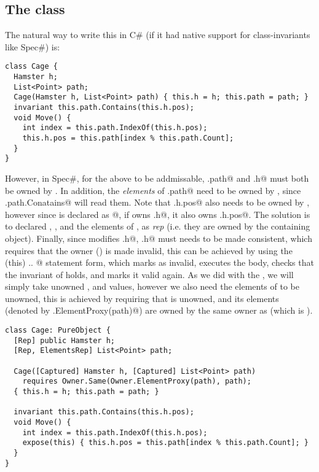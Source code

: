 \subsection{The \Q@Cage@ class} 
The natural way to write this in C\# (if it had native support for class-invariants like Spec\#) is:
\begin{lstlisting}
class Cage {
  Hamster h;
  List<Point> path;
  Cage(Hamster h, List<Point> path) { this.h = h; this.path = path; }
  invariant this.path.Contains(this.h.pos);
  void Move() { 
    int index = this.path.IndexOf(this.h.pos);
    this.h.pos = this.path[index % this.path.Count];
  } 
}
\end{lstlisting}
However, in Spec\#, for the above \Q@invariant@ to be addmissable, \Q@this.path@ and \Q@this.h@ must both be owned by \Q@this@. In addition, the \emph{elements} of \Q@this.path@ need to be owned by \Q@this@, since \Q@this.path.Conatains@ will read them. Note that \Q@this.h.pos@ also needs to be owned by \Q@this@, however since \Q@pos@ is declared as \Q@[Peer]@, if \Q@this@ owns \Q@this.h@, it also owns \Q@this.h.pos@. The solution is to declared \Q@h@, \Q@path@, and the elements of \Q@path@, as \emph{rep} (i.e. they are owned by the containing object). Finally, since \Q@Move@ modifies \Q@this.h@, \Q@this.h@ must needs to be made consistent, which requires that the owner (\Q@this@) is made invalid, this can be achieved by using the \Q@expose(this) { .. }@ statement form, which marks \Q@this@ as invalid, executes the body, checks that the invariant of \Q@this@ holds, and marks it valid again.
As we did with the \Q@Hamster@, we will simply take unowned \Q@h@, and \@path@ values, however we also need the elements of \Q@path@ to be unowned, this is achieved by requiring that \Q@path@ is unowned, and its elements (denoted by \Q@Owner.ElementProxy(path)@) are owned by the same owner as \Q@path@ (which is \Q@null@).
\begin{lstlisting}
class Cage: PureObject {
  [Rep] public Hamster h;
  [Rep, ElementsRep] List<Point> path;
	
  Cage([Captured] Hamster h, [Captured] List<Point> path)
    requires Owner.Same(Owner.ElementProxy(path), path);
  { this.h = h; this.path = path; }
	
  invariant this.path.Contains(this.h.pos);
  void Move() { 
    int index = this.path.IndexOf(this.h.pos);
    expose(this) { this.h.pos = this.path[index % this.path.Count]; }
  } 
}
\end{lstlisting}


